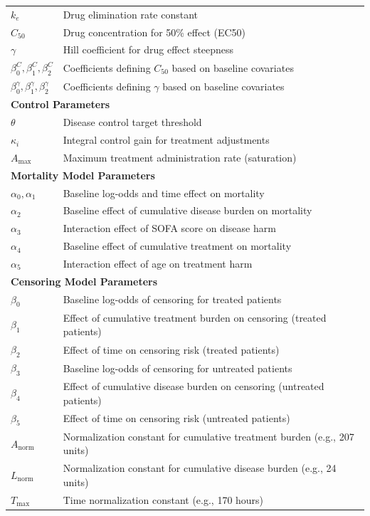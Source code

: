\begin{longtable}{lp{10cm}}
$k_e$ & Drug elimination rate constant \\
$C_{50}$ & Drug concentration for 50\% effect (EC50) \\
$\gamma$ & Hill coefficient for drug effect steepness \\
$\beta^C_0, \beta^C_1, \beta^C_2$ & Coefficients defining $C_{50}$ based on baseline covariates \\
$\beta^\gamma_0, \beta^\gamma_1, \beta^\gamma_2$ & Coefficients defining $\gamma$ based on baseline covariates \\
\midrule
\multicolumn{2}{l}{\textbf{Control Parameters}} \\
$\theta$ & Disease control target threshold \\
$\kappa_i$ & Integral control gain for treatment adjustments \\
$A_{\max}$ & Maximum treatment administration rate (saturation) \\
\midrule
\multicolumn{2}{l}{\textbf{Mortality Model Parameters}} \\
$\alpha_0, \alpha_1$ & Baseline log-odds and time effect on mortality \\
$\alpha_2$ & Baseline effect of cumulative disease burden on mortality \\
$\alpha_3$ & Interaction effect of SOFA score on disease harm \\
$\alpha_4$ & Baseline effect of cumulative treatment on mortality \\
$\alpha_5$ & Interaction effect of age on treatment harm \\
\midrule
\multicolumn{2}{l}{\textbf{Censoring Model Parameters}} \\
$\beta_0$ & Baseline log-odds of censoring for treated patients \\
$\beta_1$ & Effect of cumulative treatment burden on censoring (treated patients) \\
$\beta_2$ & Effect of time on censoring risk (treated patients) \\
$\beta_3$ & Baseline log-odds of censoring for untreated patients \\
$\beta_4$ & Effect of cumulative disease burden on censoring (untreated patients) \\
$\beta_5$ & Effect of time on censoring risk (untreated patients) \\
$A_{\mathrm{norm}}$ & Normalization constant for cumulative treatment burden (e.g., 207 units) \\
$L_{\mathrm{norm}}$ & Normalization constant for cumulative disease burden (e.g., 24 units) \\
$T_{\max}$ & Time normalization constant (e.g., 170 hours)
\end{longtable}
